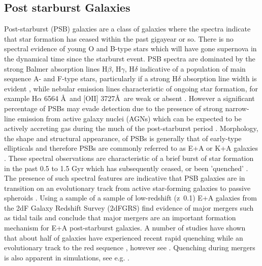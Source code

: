\subsection{Post starburst Galaxies}
\label{post-starburst-galaxies}
Post-starburst (PSB) galaxies are a class of galaxies where the spectra indicate that star formation has ceased within the past gigayear or so. There is no spectral evidence of young O and B-type stars which will have gone supernova in the dynamical time since the starburst event. PSB spectra are dominated by the strong Balmer absorption lines H$\beta$, H$\gamma$, H$\delta$ indicative of a population of main sequence A- and F-type stars, particularly if a strong  H$\delta$ absorption line width is evident \citep{1997A&A...325.1025P}, while nebular emission lines characteristic of ongoing star formation, for example H$\alpha$ 6564 \AA\ and [OII] 3727\AA\, are weak or absent \citep{2001ApJ...547L..17B,2003PASJ...55..771G,2004MNRAS.355..713B,2005MNRAS.357..937G,2018MNRAS.477.1708P}. However a significant percentage of PSBs may evade detection due to the presence of strong narrow-line emission from active galaxy nuclei (AGNs) which can be expected to be actively accreting gas during the much of the post-starburst period \citep{2018MNRAS.477.1708P}. Morphology, the shape and structural appearance, of PSBs is generally that of early-type ellipticals and therefore PSBs are commonly referred to as E+A or K+A galaxies \citep{1983ApJ...270....7D,1996ApJ...466..104Z,2009ARA&A..47..159B}. These spectral observations are characteristic of a brief burst of star formation in the past 0.5 to 1.5 Gyr which has subsequently ceased, or been 'quenched' \citep{1983ApJ...270....7D,1987MNRAS.229..423C,1997A&A...325.1025P}. The presence of such spectral features are indicative that PSB galaxies are in transition on an evolutionary track from active star-forming galaxies to passive spheroids \citep{2004MNRAS.355..713B,2012MNRAS.420..672S,2013MNRAS.429.2212M}. Using a sample of a sample of low-redshift (z~0.1) E+A galaxies from the 2dF Galaxy Redshift Survey (2dFGRS) \citet{2004MNRAS.355..713B} find evidence of major mergers such as tidal tails and conclude that major mergers are an important formation mechanism for E+A post-starburst galaxies. A number of studies have shown that about half of galaxies have experienced recent rapid quenching while an evolutionary track to the red sequence \citep{Martin_2007,10.1111/j.1365-2966.2009.14537.x,2015MNRAS.450..435S}, however see \cite{2017ApJ...845..145W}. Quenching during mergers is also apparent in simulations, see e.g. \cite{2019MNRAS.484.2447D}.

